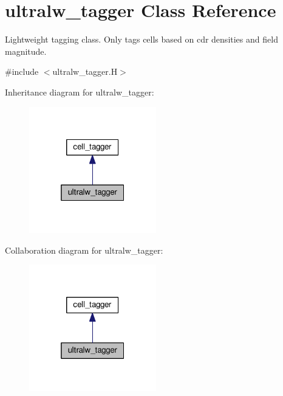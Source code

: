 \hypertarget{classultralw__tagger}{}\section{ultralw\+\_\+tagger Class Reference}
\label{classultralw__tagger}


Lightweight tagging class. Only tags cells based on cdr densities and field magnitude.  




{\ttfamily \#include $<$ultralw\+\_\+tagger.\+H$>$}



Inheritance diagram for ultralw\+\_\+tagger\+:\nopagebreak
\begin{figure}[H]
\begin{center}
\leavevmode
\includegraphics[width=157pt]{classultralw__tagger__inherit__graph}
\end{center}
\end{figure}


Collaboration diagram for ultralw\+\_\+tagger\+:\nopagebreak
\begin{figure}[H]
\begin{center}
\leavevmode
\includegraphics[width=157pt]{classultralw__tagger__coll__graph}
\end{center}
\end{figure}
